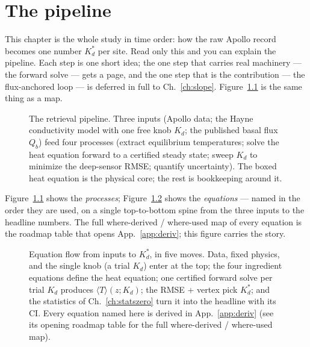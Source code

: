 \documentclass[11pt]{report}
\newcommand{\Tm}{\langle T\rangle}
\begin{document}
\chapter{The pipeline}\label{ch:pipeline}

This chapter is the whole study in time order: how the raw Apollo record becomes
one number $K_d^{*}$ per site. Read only this and you can explain the pipeline.
Each step is one short idea; the one step that carries real machinery --- the
forward solve --- gets a page, and the one step that is the contribution --- the
flux-anchored loop --- is deferred in full to Ch.~\ref{ch:slope}.
Figure~\ref{fig:pipeline} is the same thing as a map.

\begin{figure}[htbp]\centering

\caption{The retrieval pipeline. Three inputs (Apollo data; the Hayne
conductivity model with one free knob $K_d$; the published basal flux $Q_b$)
feed four processes (extract equilibrium temperatures; solve the heat equation
forward to a certified steady state; sweep $K_d$ to minimize the deep-sensor
RMSE; quantify uncertainty). The boxed heat equation is the physical core; the
rest is bookkeeping around it.}
\label{fig:pipeline}
\end{figure}

Figure~\ref{fig:pipeline} shows the \emph{processes}; Figure~\ref{fig:eqnflow}
shows the \emph{equations} --- named in the order they are used, on a single
top-to-bottom spine from the three inputs to the headline numbers. The full
where-derived / where-used map of every equation is the roadmap table that opens
App.~\ref{app:deriv}; this figure carries the story.

\begin{figure}[p]\centering

\caption{Equation flow from inputs to $K_d^{*}$, in five moves. Data, fixed
physics, and the single knob (a trial $K_d$) enter at the top; the four
ingredient equations define the heat equation; one certified forward solve per
trial $K_d$ produces $\Tm(z;K_d)$; the RMSE + vertex pick $K_d^{*}$; and the
statistics of Ch.~\ref{ch:statszero} turn it into the headline with its CI.
Every equation named here is derived in App.~\ref{app:deriv} (see its opening
roadmap table for the full where-derived / where-used map).}
\label{fig:eqnflow}
\end{figure}
\end{document}

